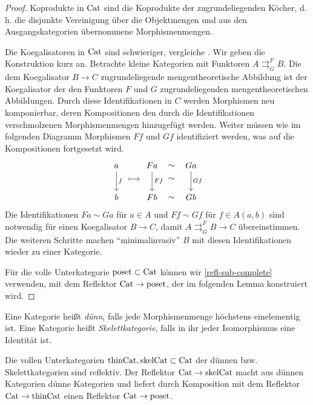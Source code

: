 \begin{proof}
  Koprodukte in $\operatorname{Cat}$ sind die Koprodukte der zugrundeliegenden
  Köcher, d. h. die disjunkte Vereinigung über die Objektmengen und
  aus den Ausgangskategorien übernommene Morphismenmengen.

  Die Koegalisatoren in $\operatorname{Cat}$ sind schwieriger, vergleiche
  \cite{BBP}. Wir geben die Konstruktion kurz an. Betrachte kleine
  Kategorien mit Funktoren $A
  \mathrel{\mathop{\rightrightarrows}^{F}_{G}} B$. Die dem
  Koegalisator $B \to C$ zugrundeliegende mengentheoretische Abbildung
  ist der Koegalisator der den Funktoren $F$ und $G$ zugrundeliegenden
  mengentheoretischen Abbildungen. Durch diese Identifikationen in $C$
  werden Morphismen neu komponierbar, deren Kompositionen den durch
  die Identifikationen verschmolzenen Morphismenmengen hinzugefügt
  werden. Weiter müssen wie im folgenden Diagramm Morphismen $Ff$ und
  $Gf$ identifiziert werden, was auf die Kompositionen fortgesetzt
  wird.
  \[ 
  \begin{tikzcd}
    a \ar{dd}{f}
    & Fa \rar[phantom]{\sim} \ar{dd}{Ff} & Ga \ar{dd}{Gf}  \\[-10pt]
    \rar[mapsto, shorten <= 2em, xshift = -1em]
    & \rar[phantom]{\sim} & \lar[phantom] \\[-10pt]
    b & Fb \rar[phantom]{\sim} & Gb
  \end{tikzcd}
  \]  
  Die Identifikationen $Fa \sim Ga$ für $a \in A$ und $Ff \sim Gf$ für
  $f \in A(a, b)$ sind notwendig für einen Koegalisator $B \to C$,
  damit $A \mathrel{\mathop{\rightrightarrows}^{F}_{G}} B \to C$
  übereinstimmen. Die weiteren Schritte machen ``minimalinvasiv'' $B$
  mit diesen Identifikationen wieder zu einer Kategorie.

  Für die volle Unterkategorie $\operatorname{poset} \subset \operatorname{Cat}$ können wir
  \ref{refl-sub-complete} verwenden, mit dem Reflektor $\operatorname{Cat} \to
  \operatorname{poset}$, der im folgenden Lemma konstruiert wird.
\end{proof}
\begin{defn}
  Eine Kategorie heißt \emph{dünn}, falls jede Morphismenmenge
  höchs\-tens einelementig ist. Eine Kategorie heißt
  \emph{Skelettkategorie}, falls in ihr jeder Isomorphismus eine
  Identität ist.
\end{defn}
\begin{lemma} \label{poset-reflective}
  Die vollen Unterkategorien $\mathrm{thinCat}, \mathrm{skelCat}
  \subset \operatorname{Cat}$ der dünnen bzw. Skelettkategorien sind reflektiv. Der
  Reflektor $\operatorname{Cat} \to \mathrm{skelCat}$ macht aus dünnen Kategorien
  dünne Kategorien und liefert durch Komposition mit dem Reflektor
  $\operatorname{Cat} \to \mathrm{thinCat}$ einen Reflektor $\operatorname{Cat} \to \operatorname{poset}$.
\end{lemma}
